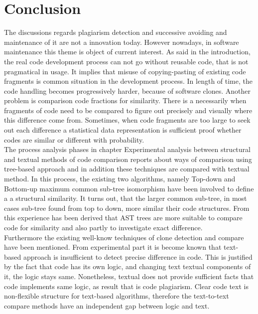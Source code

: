 \documentclass{report}
\begin{document}


\chapter{Conclusion}
\label{cha:Conclusion}

The discussions regards plagiarism detection and successive avoiding and maintenance of it are not a innovation today. However nowadays, in software maintenance this theme is object of current interest. As said in the introduction, the real code development process can not go without reusable code, that is not pragmatical in usage. It implies that misuse of copying-pasting of existing code fragments is common situation in the development process. In length of time, the code handling becomes progressively harder, because of software clones. Another problem is comparison code fractions for similarity. There is a necessarily when fragments of code need to be compared to figure out precisely and visually where this difference come from. 
Sometimes, when code fragments are too large to seek out each difference a statistical data representation is sufficient proof whether codes are similar or different with probability.
\\
The process analysis phases in chapter Experimental analysis between structural and textual methods of code comparison reports about ways of comparison using tree-based approach and in addition these techniques are compared with textual method. In this process, the existing two algorithms, namely Top-down and Bottom-up maximum common sub-tree isomorphism have been involved to define a a structural similarity. It turns out, that the larger common sub-tree, in most cases sub-tree found from top to down, more similar their code structures. From this experience has been derived that AST trees are more suitable to compare code for similarity and also partly to investigate exact difference.
\\
Furthermore the existing well-know techniques of clone detection and compare have been mentioned. From experimental part it is become known that text-based approach is insufficient to detect precise difference in code. This is justified by the fact that code has its own logic, and changing text textual components of it, the logic stays same. Nonetheless, textual does not provide sufficient facts that code implements same logic, as result that is code plagiarism. 
Clear code text is non-flexible structure for text-based algorithms, therefore the text-to-text compare methods have an independent gap between logic and text.
\end{document}
